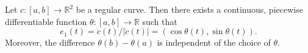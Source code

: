 Let $c: [a, b] \to \mathbb{R}^2$ be a regular curve. Then there exists a continuous, piecewise differentiable function $\theta: [a, b] \to \mathbb{R}$ such that
$$e_1(t) = \dot{c}(t)/|\dot{c}(t)| = (\cos \theta(t), \sin \theta(t)).$$
Moreover, the difference $\theta(b) - \theta(a)$ is independent of the choice of $\theta$.